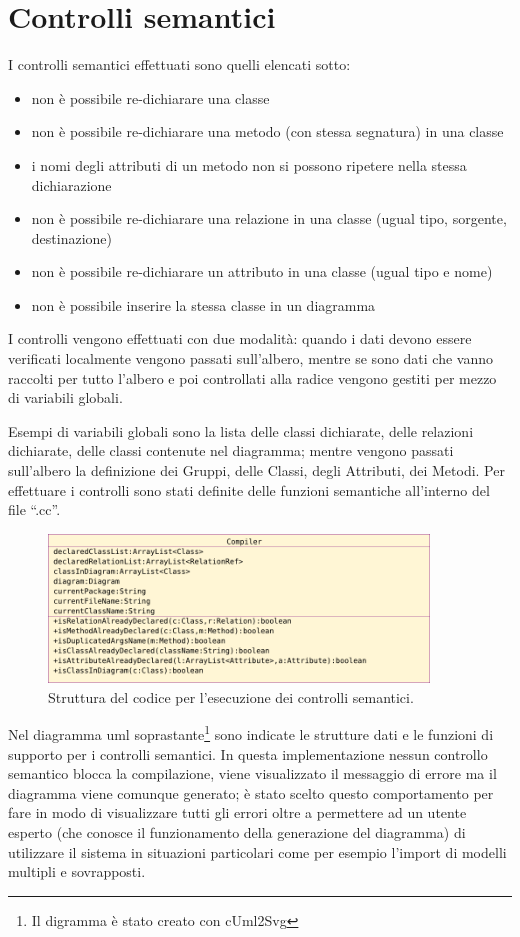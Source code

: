 \section{Controlli semantici}

I controlli semantici effettuati sono quelli elencati sotto:
\begin{itemize}
   \item non è possibile re-dichiarare una classe
   \item non è possibile re-dichiarare una metodo (con stessa segnatura) in una
   classe
   \item i nomi degli attributi di un metodo non si possono ripetere nella stessa dichiarazione
   \item non è possibile re-dichiarare una relazione in una classe (ugual tipo,
   sorgente, destinazione)
   \item non è possibile re-dichiarare un attributo in una classe (ugual tipo e
   nome)
   \item non è possibile inserire la stessa classe in un diagramma 
\end{itemize}


I controlli vengono effettuati con due modalità: quando i dati devono essere
verificati localmente vengono passati sull'albero, mentre se sono dati che vanno
raccolti per tutto l'albero e poi controllati alla radice vengono gestiti per
mezzo di variabili globali.

Esempi di variabili globali sono la lista delle classi dichiarate, delle
relazioni dichiarate, delle classi contenute nel diagramma; mentre vengono passati
sull'albero la
definizione dei Gruppi, delle Classi, degli Attributi, dei Metodi.
Per effettuare i controlli sono stati definite delle funzioni semantiche
all'interno del file ``.cc''.

\begin{figure}[htp]
\begin{center}
  \includegraphics[width=0.9\textwidth]{img/uml_compilatore}
  \caption[labelInTOC]{Struttura del codice per l'esecuzione dei controlli semantici.}
\end{center}
\end{figure}

Nel diagramma uml soprastante\footnote{Il digramma è stato creato con cUml2Svg} sono
indicate le strutture dati e le funzioni di supporto per i controlli semantici.
In questa implementazione nessun controllo semantico blocca la compilazione,
viene visualizzato il messaggio di errore ma il diagramma viene comunque
generato; è stato scelto questo comportamento per fare in modo di visualizzare
tutti gli errori oltre a permettere ad un utente esperto (che conosce il
funzionamento della generazione del diagramma) di utilizzare il sistema in
situazioni particolari come per esempio l'import di modelli multipli e sovrapposti.
